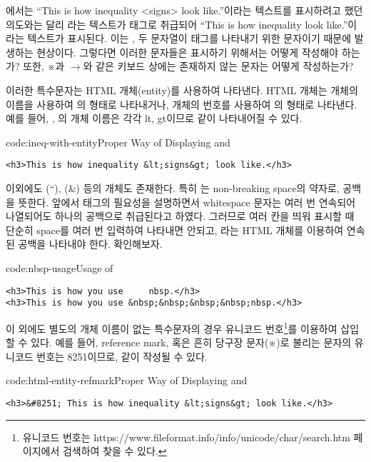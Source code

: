 에서는 ``This is how inequality <signs> look like.''이라는 텍스트를 표시하려고 했던 의도와는 달리 라는 텍스트가 태그로 취급되어 ``This is how inequality look like.''이라는 텍스트가 표시된다. 이는 \cd{<}, \cd{>} 두 문자열이 태그를 나타내기 위한 문자이기 때문에 발생하는 현상이다. 그렇다면 이러한 문자들은 표시하기 위해서는 어떻게 작성해야 하는가? 또한, ※과 $\rightarrow$와 같은 키보드 상에는 존재하지 않는 문자는 어떻게 작성하는가?

이러한 특수문자는 HTML 개체(entity)를 사용하여 나타낸다. HTML 개체는 개체의 이름을 사용하여 의 형태로 나타내거나, 개체의 번호를 사용하여 의 형태로 나타낸다. 예를 들어, \cd{<}, \cd{>}의 개체 이름은 각각 lt, gt이므로 \는 \와 같이 나타내어질 수 있다.

\begin{codeenv}{code:ineq-with-entity}{Proper Way of Displaying \cd{<} and \cd{>}}\begin{verbatim}
<h3>This is how inequality &lt;signs&gt; look like.</h3>
\end{verbatim}
\end{codeenv}

이외에도 (``), (\&) 등의 개체도 존재한다. 특히 는 non-breaking space의 약자로, 공백을 뜻한다. 앞에서  태그의 필요성을 설명하면서 whitespace 문자는 여러 번 연속되어 나열되어도 하나의 공백으로 취급된다고 하였다. 그러므로 여러 칸을 띄워 표시할 때 단순히 space를 여러 번 입력하여 나타내면 안되고, 라는 HTML 개체를 이용하여 연속된 공백을 나타내야 한다. \를 확인해보자.

\begin{codeenv}{code:nbsp-usage}{Usage of }\begin{verbatim}
<h3>This is how you use     nbsp.</h3>
<h3>This is how you use &nbsp;&nbsp;&nbsp;&nbsp;nbsp.</h3>
\end{verbatim}
\end{codeenv}

이 외에도 별도의 개체 이름이 없는 특수문자의 경우 유니코드 번호\footnote{유니코드 번호는 https://www.fileformat.info/info/unicode/char/search.htm 페이지에서 검색하여 찾을 수 있다.}를 이용하여 삽입할 수 있다. 예를 들어, reference mark, 혹은 흔히 당구장 문자(※)로 불리는 문자의 유니코드 번호는 8251이므로, \와 같이 작성될 수 있다.

\begin{codeenv}{code:html-entity-refmark}{Proper Way of Displaying \cd{<} and \cd{>}}\begin{verbatim}
<h3>&#8251; This is how inequality &lt;signs&gt; look like.</h3>
\end{verbatim}
\end{codeenv}

